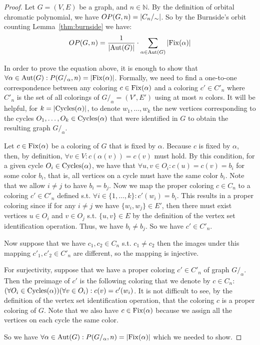 \begin{proof}

    Let $G=(V,E)$ be a graph, and $n \in \mathbb{N}$. By the definition of orbital chromatic polynomial, we have $OP(G,n) = \left|{C_n /_{\sim}}\right|$. So by the Burnside's orbit counting Lemma~\ref{thm:burnside} we have:
    $$OP(G,n) = \frac{1}{\left|{\operatorname{Aut}(G)}\right|} \cdot \sum_{\alpha \in \operatorname{Aut}(G)} \left|{\operatorname{Fix}(\alpha)}\right|$$

    In order to prove the equation above, it is enough to show that $\forall \alpha \in \operatorname{Aut}(G) : P(G/_{\alpha},n) = \left|{\operatorname{Fix}(\alpha)}\right|$. Formally, we need to find a one-to-one correspondence between any coloring $c \in \operatorname{Fix}(\alpha)$ and a coloring $c' \in C'_n$ where $C'_n$ is the set of all colorings of $G /_\alpha = (V',E')$ using at most $n$ colors. It will be helpful, for $k = \left|{\operatorname{Cycles}(\alpha)}\right|$, to denote $w_1, \ldots , w_k$ the new vertices corresponding to the cycles $O_1, \ldots ,O_k \in \operatorname{Cycles}(\alpha)$ that were identified in $G$ to obtain the resulting graph $G/_\alpha$.
    
    Let $c \in \operatorname{Fix}(\alpha)$ be a coloring of $G$ that is fixed by $\alpha$. Because $c$ is fixed by $\alpha$, then, by definition, $\forall v \in V : c(\alpha(v)) = c(v)$ must hold. By this condition, for a given cycle $O_i \in \operatorname{Cycles}(\alpha)$, we have that $\forall u,v \in O_i : c(u) = c(v) = b_i$ for some color $b_i$, that is, all vertices on a cycle must have the same color $b_i$. Note that we allow $i \neq j$ to have $b_i = b_j$. Now we map the proper coloring $c \in C_n$ to a coloring $c' \in C'_n$ defined s.t. $\forall i \in \{1, \ldots ,k\} : c'(w_i) = b_i$. This results in a proper coloring since if for any $i \neq j$ we have $\{w_i,w_j\} \in E'$, then there must exist vertices $u \in O_i$ and $v \in O_j$ s.t. $\{u,v\} \in E$ by the definition of the vertex set identification operation. Thus, we have $b_i \neq b_j$. So we have $c' \in C'_n$. 
    
    Now suppose that we have $c_1,c_2 \in C_n$ s.t. $c_1 \neq c_2$ then the images under this mapping $c'_1,c'_2 \in C'_n$ are different, so the mapping is injective.

    For surjectivity, suppose that we have a proper coloring $c' \in C'_n$ of graph $G/_\alpha$. Then the preimage of $c'$ is the following coloring that we denote by $c \in C_n$: $(\forall O_i \in \operatorname{Cycles}(\alpha))( \forall v \in O_i) : c(v) = c'(w_i)$. It is not difficult to see, by the definition of the vertex set identification operation, that the coloring $c$ is a proper coloring of $G$. Note that we also have $c \in \operatorname{Fix}(\alpha)$ because we assign all the vertices on each cycle the same color.

    So we have $\forall \alpha \in \operatorname{Aut}(G) : P(G/_{\alpha},n) = \left|{\operatorname{Fix}(\alpha)}\right|$ which we needed to show. 
     
\end{proof}

